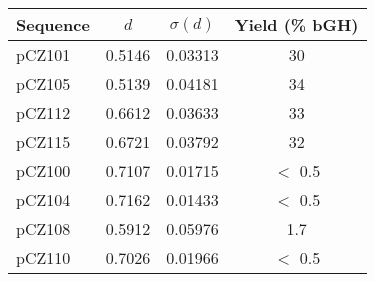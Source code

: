 \begin{tabular}{lccc}
  \toprule
  \textbf{Sequence} & $d$ & $\sigma(d)$ & Yield (\% bGH)\\
  \midrule
  pCZ101 & 0.5146 & 0.03313 & 30 \\
  pCZ105 & 0.5139 & 0.04181 & 34\\
  pCZ112 & 0.6612 & 0.03633 & 33\\
  pCZ115 & 0.6721 & 0.03792 & 32\\
  \midrule
  pCZ100 & 0.7107 & 0.01715 & $<$ 0.5\\
  pCZ104 & 0.7162 & 0.01433 & $<$ 0.5\\
  pCZ108 & 0.5912 & 0.05976 & 1.7\\
  pCZ110 & 0.7026 & 0.01966 & $<$ 0.5\\
  \bottomrule
\end{tabular}
